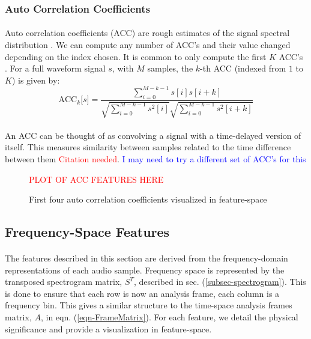 \documentclass[12pt,letterpaper]{article}
\begin{document}
\subsubsection{Auto Correlation Coefficients}

\paragraph*{}Auto correlation coefficients (ACC) are rough estimates of the signal spectral distribution . We can compute any number of ACC's and their value changed depending on the index chosen. It is common to only compute the first $K$ ACC's \cite{Virtanen}. For a full waveform signal $s$, with $M$ samples, the $k$-th ACC (indexed from $1$ to $K$) is given by:
\begin{equation}
\label{eqn-FeatureACC}
\text{ACC}_k\big[ s \big] = 
\frac{\sum_{i=0}^{M-k-1}s[i]s[i+k]} {\sqrt{\sum_{i=0}^{M-k-1}s^2[i]} \sqrt{\sum_{i=0}^{M-k-1}s^2[i+k]}}
\end{equation}

\paragraph*{}An ACC can be thought of as convolving a signal with a time-delayed version of itself. This measures similarity between samples related to the time difference between them \textcolor{red}{Citation needed}. \textcolor{blue}{I may need to try a different set of ACC's for this}

\begin{figure}[H]
\label{fig-FeatureACC}
\begin{center}
\textcolor{red}{PLOT OF ACC FEATURES HERE}
\end{center}
\caption{First four auto correlation coefficients visualized in feature-space}
\end{figure}


\newpage

\subsection{Frequency-Space Features}
\label{subsec-frequency}

\paragraph*{}The features described in this section are derived from the frequency-domain representations of each audio sample. Frequency space is represented by the transposed spectrogram matrix, $S^T$, described in sec. (\ref{subsec-spectrogram}). This is done to ensure that each  row is now an analysis frame, each column is a frequency bin. This gives a similar structure to the time-space analysis frames matrix, $A$, in eqn. (\ref{eqn-FrameMatrix}).
For each feature, we detail the physical significance and provide a visualization in feature-space.
\end{document}

